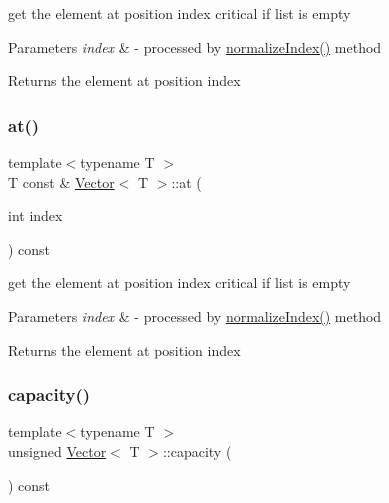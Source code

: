 get the element at position index critical if list is empty 
\begin{DoxyParams}{Parameters}
{\em index} & -\/ processed by \hyperlink{classVector_a63f7ddd7328b13bc30b2243b50f70ec9}{normalize\+Index()} method \\
\hline
\end{DoxyParams}
\begin{DoxyReturn}{Returns}
the element at position index 
\end{DoxyReturn}
\mbox{\label{classVector_a2539a2d9ca64fd4e400d1bdc23dc292c}} 
\subsubsection{\texorpdfstring{at()}{at()}\hspace{0.1cm}{\footnotesize\ttfamily [2/2]}}
{\footnotesize\ttfamily template$<$typename T $>$ \\
T const  \& \hyperlink{classVector}{Vector}$<$ T $>$\+::at (\begin{DoxyParamCaption}\item[{int}]{index }\end{DoxyParamCaption}) const}

get the element at position index critical if list is empty 
\begin{DoxyParams}{Parameters}
{\em index} & -\/ processed by \hyperlink{classVector_a63f7ddd7328b13bc30b2243b50f70ec9}{normalize\+Index()} method \\
\hline
\end{DoxyParams}
\begin{DoxyReturn}{Returns}
the element at position index 
\end{DoxyReturn}
\mbox{\label{classVector_a30435b1635ae160705f53755d25a407b}} 
\subsubsection{\texorpdfstring{capacity()}{capacity()}}
{\footnotesize\ttfamily template$<$typename T $>$ \\
unsigned \hyperlink{classVector}{Vector}$<$ T $>$\+::capacity (\begin{DoxyParamCaption}{ }\end{DoxyParamCaption}) const}

